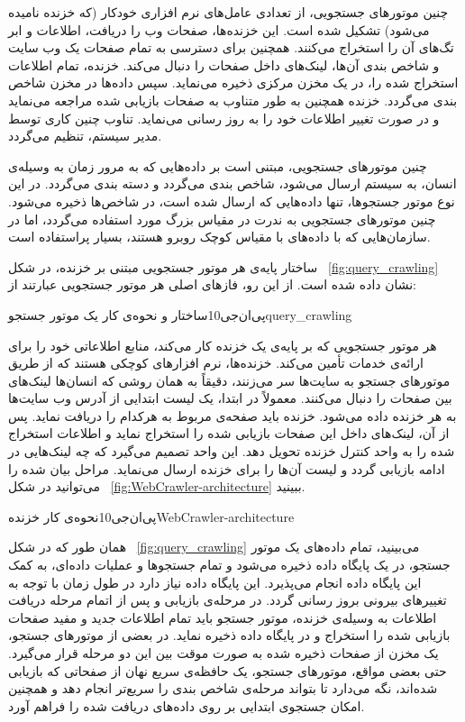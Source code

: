 چنین موتورهای جستجویی، از تعدادی عامل‌های نرم افزاری خودکار (که خزنده نامیده می‌شود) تشکیل شده است. این خزنده‌ها، صفحات وب را دریافت، اطلاعات و ابر تگ‌های آن را استخراج می‌کنند. همچنین برای دسترسی به تمام صفحات یک وب سایت و شاخص بندی آن‌ها، لینک‌های داخل صفحات را دنبال می‌کند. خزنده، تمام اطلاعات استخراج شده را، در یک مخزن مرکزی ذخیره می‌نماید. سپس داده‌ها در مخزن شاخص بندی می‌گردد. خزنده همچنین به طور متناوب به صفحات بازیابی شده مراجعه می‌نماید و در صورت تغییر اطلاعات خود را به روز رسانی می‌نماید. تناوب چنین کاری توسط مدیر سیستم، تنظیم می‌گردد.


چنین موتورهای جستجویی، مبتنی است بر داده‌هایی که به مرور زمان به وسیله‌ی انسان، به سیستم ارسال می‌شود، شاخص بندی می‌گردد و دسته بندی می‌گردد. در این نوع موتور جستجوها، تنها داده‌هایی که ارسال شده است، در شاخص‌ها ذخیره می‌شود. چنین موتورهای جستجویی به ندرت در مقیاس بزرگ مورد استفاده می‌گردد، اما در سازمان‌هایی که با داده‌های با مقیاس کوچک روبرو هستند، بسیار پراستفاده است.


ساختار پایه‌ی هر موتور جستجویی مبتنی بر خزنده، در شکل ~\ref{fig:query_crawling} نشان داده شده است. از این رو، فازهای اصلی هر موتور جستجویی عبارتند از:

‌پی‌ان‌جی{10}{ساختار و نحوه‌ی کار یک موتور جستجو}{query_crawling}


هر موتور جستجویی که بر پایه‌ی یک خزنده کار می‌کند، منابع اطلاعاتی خود را برای ارائه‌ی خدمات تأمین می‌کند. خزنده‌ها، نرم افزارهای کوچکی هستند که از طریق موتورهای جستجو به سایت‌ها سر می‌زنند، دقیقاً به‌‌ همان روشی که انسان‌ها لینک‌های بین صفحات را دنبال می‌کنند. معمولاً در ابتدا، یک لیست ابتدایی از آدرس وب سایت‌ها به هر خزنده داده می‌شود. خزنده باید صفحه‌ی مربوط به هرکدام را دریافت نماید. پس از آن، لینک‌های داخل این صفحات بازیابی شده را استخراج نماید و اطلاعات استخراج شده را به واحد کنترل خزنده تحویل دهد. این واحد تصمیم می‌گیرد که چه لینک‌هایی در ادامه بازیابی گردد و لیست آن‌ها را برای خزنده ارسال می‌نماید.
مراحل بیان شده را می‌توانید در شکل ~\ref {fig:WebCrawler-architecture} ببینید.

‌پی‌ان‌جی{10}{نحوه‌ی کار خزنده}{WebCrawler-architecture}

همان طور که در شکل ~\ref{fig:query_crawling} می‌بینید، تمام داده‌های یک موتور جستجو، در یک پایگاه داده ذخیره می‌شود و تمام جستجو‌ها و عملیات داده‌ای، به کمک این پایگاه داده انجام می‌پذیرد. این پایگاه داده نیاز دارد در طول زمان با توجه به تغییرهای بیرونی بروز رسانی گردد. در مرحله‌ی بازیابی و پس از اتمام مرحله دریافت اطلاعات به وسیله‌ی خزنده، موتور جستجو باید تمام اطلاعات جدید و مفید صفحات بازیابی شده را استخراج و در پایگاه داده ذخیره نماید. در بعضی از موتورهای جستجو، یک مخزن از صفحات ذخیره شده به صورت موقت بین این دو مرحله قرار می‌گیرد. حتی بعضی مواقع، موتورهای جستجو، یک حافظه‌ی سریع نهان از صفحاتی که بازیابی شده‌اند، نگه می‌دارد تا بتواند مرحله‌ی شاخص بندی را سریع‌تر انجام دهد و همچنین امکان جستجوی ابتدایی بر روی داده‌های دریافت شده را فراهم آورد.


